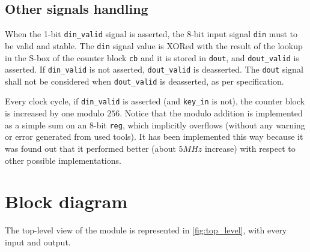 \subsection{Other signals handling}
When the 1-bit \lstinline{din_valid} signal is asserted, the 8-bit input signal \lstinline{din} must to be valid and stable. The \lstinline{din} signal value is XORed with the result of the lookup in the S-box of the counter block \lstinline{cb} and it is stored in \lstinline{dout}, and \lstinline{dout_valid} is asserted. If \lstinline{din_valid} is not asserted, \lstinline{dout_valid} is deasserted. The \lstinline{dout} signal shall not be considered when \lstinline{dout_valid} is deasserted, as per specification.

Every clock cycle, if \lstinline{din_valid} is asserted (and \lstinline{key_in} is not), the counter block is increased by one modulo $256$. Notice that the modulo addition is implemented as a simple sum on an 8-bit \lstinline{reg}, which implicitly overflows (without any warning or error generated from used tools). It has been implemented this way because it was found out that it performed better (about $5 MHz$ increase) with respect to other possible implementations.

\clearpage
\section{Block diagram}
The top-level view of the module is represented in \cref{fig:top_level}, with every input and output.


